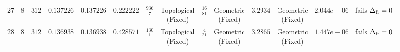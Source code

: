 {\begin{tabular}{|c|c|c|c|c|c|c|c|c|c|c|c|c|c|}
$27$ & $8$ & $312$ & $0.137226$ & $0.137226$ & $0.222222$ & $\frac{936}{7}$ & \shortstack{\scriptsize Topological\\ \scriptsize (Fixed)} & $\frac{16}{81}$ & \shortstack{\scriptsize Geometric\\ \scriptsize (Fixed)} & $3.2934$ & \shortstack{\scriptsize Geometric\\ \scriptsize (Fixed)} & $2.044e-06$ & \shortstack{\scriptsize fails\\ \scriptsize $\Delta_{\rm fr}=0$} \\
$28$ & $8$ & $312$ & $0.136938$ & $0.136938$ & $0.428571$ & $\frac{130}{1}$ & \shortstack{\scriptsize Topological\\ \scriptsize (Fixed)} & $\frac{4}{21}$ & \shortstack{\scriptsize Geometric\\ \scriptsize (Fixed)} & $3.2865$ & \shortstack{\scriptsize Geometric\\ \scriptsize (Fixed)} & $1.447e-06$ & \shortstack{\scriptsize fails\\ \scriptsize $\Delta_{\rm fr}=0$} \\
\hline
\end{tabular}%
}
